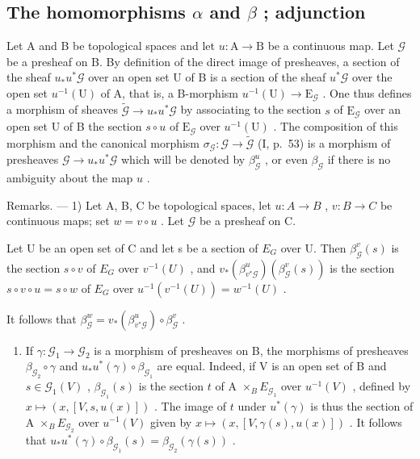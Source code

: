 \subsection{\texorpdfstring{The homomorphisms \(\alpha\) and \(\beta\) ; adjunction}{The homomorphisms alpha and beta ; adjunction}}

Let A and B be topological spaces and let \(u\colon\mathrm{A}\to\mathrm{B}\) be a continuous map. Let \(\mathcal{G}\) be a presheaf on B. By definition of the direct image of presheaves, a section of the sheaf \(u_{*}u^{*}\mathcal{G}\) over an open set U of B is a section of the sheaf \(u^{*}\mathcal{G}\) over the open set \(u^{-1}(\mathrm{U})\) of A, that is, a B-morphism \(u^{-1}(\mathrm{U})\to\mathrm{E}_{\mathcal{G}}\) . One thus defines a morphism of sheaves \(\widetilde{\mathcal{G}}\to u_{*}u^{*}\mathcal{G}\) by associating to the section \(s\) of \(\mathrm{E}_{\mathcal{G}}\) over an open set U of B the section \(s\circ u\) of \(\mathrm{E}_{\mathcal{G}}\) over \(u^{-1}(\mathrm{U})\) . The composition of this morphism and the canonical morphism \(\sigma_{\mathcal{G}}\colon\mathcal{G}\to\widetilde{\mathcal{G}}\) (I, p.~53) is a morphism of presheaves \(\mathcal{G}\to u_{*}u^{*}\mathcal{G}\) which will be denoted by \(\beta_{\mathcal{G}}^{u}\) , or even \(\beta_{\mathcal{G}}\) if there is no ambiguity about the map \(u\) .

Remarks. --- 1) Let A, B, C be topological spaces, let \(u\colon A \to B\) , \(v\colon B \to C\) be continuous maps; set \(w = v \circ u\) . Let \(\mathcal{G}\) be a presheaf on C.

Let U be an open set of C and let s be a section of \(E_{G}\) over U. Then \(\beta_{\mathcal{G}}^{v}(s)\) is the section \(s \circ v\) of \(E_{G}\) over \(v^{-1}(U)\) , and \(v_{*}(\beta_{v^{*}\mathcal{G}}^{u})(\beta_{\mathcal{G}}^{v}(s))\) is the section \(s \circ v \circ u = s \circ w\) of \(E_{G}\) over \(u^{-1}(v^{-1}(U)) = w^{-1}(U)\) .

It follows that \(\beta_{\mathcal{G}}^{w} = v_{*}(\beta_{v^{*}\mathcal{G}}^{u})\circ \beta_{\mathcal{G}}^{v}\) .

\begin{enumerate}
\def\labelenumi{\arabic{enumi})}
\setcounter{enumi}{1}
\tightlist
\item
  If \(\gamma\colon\mathcal{G}_{1}\to\mathcal{G}_{2}\) is a morphism of presheaves on B, the morphisms of presheaves \(\beta_{\mathcal{G}_{2}}\circ\gamma\) and \(u_{*}u^{*}(\gamma)\circ\beta_{\mathcal{G}_{1}}\) are equal. Indeed, if V is an open set of B and \(s\in\mathcal{G}_{1}(V)\) , \(\beta_{\mathcal{G}_{1}}(s)\) is the section \(t\) of A \(\times_{B}E_{\mathcal{G}_{1}}\) over \(u^{-1}(V)\) , defined by \(x\mapsto(x,[V,s,u(x)])\) . The image of \(t\) under \(u^{*}(\gamma)\) is thus the section of A \(\times_{B}E_{\mathcal{G}_{2}}\) over \(u^{-1}(V)\) given by \(x\mapsto(x,[V,\gamma(s),u(x)])\) . It follows that \(u_{*}u^{*}(\gamma)\circ\beta_{\mathcal{G}_{1}}(s)=\beta_{\mathcal{G}_{2}}(\gamma(s))\) .
\end{enumerate}

